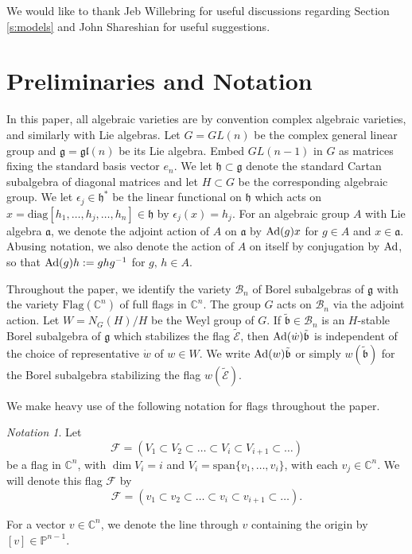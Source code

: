 \documentclass[12pt]{amsart}
\numberwithin{equation}{section}
\theoremstyle{remark}
\newtheorem{nota}[thm]{Notation}
\theoremstyle{definition}
\newcommand{\fa}{\mbox{${\mathfrak a}$}}
\newcommand{\fg}{\mbox{${\mathfrak g}$}}
\newcommand{\fh}{\mbox{${\mathfrak h}$}}
\newcommand{\fb}{\mbox{${\mathfrak b}$}}
\newcommand{\eps}{\epsilon}
\newcommand{\C}{\mbox{${\mathbb C}$}}
\newcommand{\Ad}{{\rm Ad}}
\newcommand{\fgl}{\mathfrak{gl}}
\newcommand{\B}{\mathcal{B}}
\newcommand{\F}{\mathcal{F}}
\begin{document}
We would like to thank Jeb Willebring for useful discussions regarding Section \ref{s:models} and John Shareshian for useful suggestions.

\section{Preliminaries and Notation}\label{s:prelim}

In this paper, all algebraic varieties are by convention complex algebraic varieties, and similarly with Lie algebras.  Let $G=GL(n)$ be the complex general linear group and $\fg=\fgl(n)$ be its Lie algebra.  Embed $GL(n-1)$ in $G$ as matrices fixing the standard basis vector $e_{n}$. We let $\fh\subset \fg$ denote the standard Cartan subalgebra of diagonal matrices and let $H\subset G$ be the corresponding algebraic group.  We let $\eps_{j}\in\fh^{*}$ be the linear functional on $\fh$ which acts on $x= \mbox{diag}[h_{1},\dots, h_{j},\dots, h_{n}]\in\fh$ by $\eps_{j}(x)=h_{j}$.  For an algebraic group $A$ with Lie algebra $\fa$, we denote the adjoint action of $A$ on $\fa$ by $\Ad(g)x$ for $g\in A$ and $x\in\fa$.  Abusing notation, we also denote the action of $A$ on itself by conjugation by $\Ad$, so that $\Ad(g)h:=ghg^{-1}$ for $g,\, h\in A$.  

 Throughout the paper, we identify the variety $\B_{n}$ of Borel subalgebras of $\fg$ with the variety
 $\mbox{Flag}(\C^{n})$ of full
flags in $\C^{n}$.  The group $G$ acts on $\B_{n}$ via the adjoint action.  Let $W=N_{G}(H)/H$ be the Weyl group of $G$.  If $\tilde{\fb}\in \B_{n}$ is an $H$-stable Borel subalgebra of $\fg$ which stabilizes the flag $\tilde{\mathcal{E}}$, then $\Ad(\dot{w}) \tilde{\fb}$ is independent of the choice of representative $\dot{w}$ of $w\in W$.  We write $\Ad(w)\tilde{\fb}$ or simply $w(\tilde{\fb})$ for the Borel subalgebra stabilizing the flag $w(\tilde{\mathcal{E}})$.  

 We make heavy use of the following notation for flags throughout the paper.  
\begin{nota}\label{nota:standard} Let 
   $$
  \mathcal{F}=(V_{1}\subset V_{2}\subset\dots\subset V_{i}\subset V_{i+1}\subset \dots)
   $$
be a flag in $\C^{n}$, with $\dim V_{i}=i$ and $V_{i}=\mbox{span}\{v_{1},\dots, v_{i}\}$, with each $v_{j}\in\C^{n}$.  We will denote this flag $\mathcal{F}$ 
by
   $$
  \mathcal{F}=  (v_{1}\subset  v_{2}\subset\dots\subset v_{i}\subset v_{i+1}\subset\dots ). 
   $$
\end{nota}
\noindent For a vector $v\in\C^{n}$, we denote the line through $v$ containing the origin by $[v]\in\mathbb{P}^{n-1}$.
\end{document}
